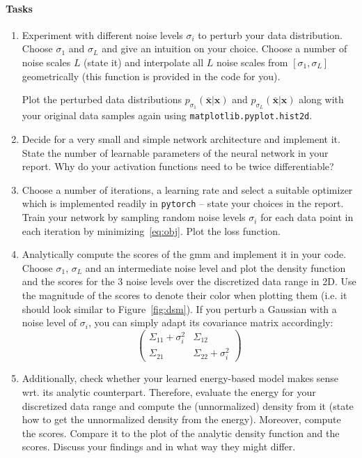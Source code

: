 \documentclass{article}
\renewcommand{\vec}[1]{\textbf{#1}}
\renewcommand{\vec}[1]{\textbf{#1}}
\begin{document}
\paragraph{Tasks}
\begin{enumerate}
\item Experiment with different noise levels $\sigma_i$ to perturb your data distribution. Choose $\sigma_{1}$ and $\sigma_{L}$ and give an intuition on your choice. Choose a number of noise scales $L$ (state it) and interpolate all $L$ noise scales from $[\sigma_1,\sigma_L]$ geometrically (this function is provided in the code for you). 

Plot the perturbed data distributions $p_{\sigma_{1}}(\bar{ \vec x}|\vec x)$ and $p_{\sigma_{L}}(\bar{ \vec x}|\vec x)$ along with your original data samples again using \texttt{matplotlib.pyplot.hist2d}. 
\item Decide for a very small and simple network architecture and implement it. State the number of learnable parameters of the neural network in your report. Why do your activation functions need to be twice differentiable?
\item Choose a number of iterations, a learning rate and select a suitable optimizer which is implemented readily in \texttt{pytorch} -- state your choices in the report. Train your network by sampling random noise levels $\sigma_i$ for each data point in each iteration by minimizing~\eqref{eq:obj}. Plot the loss function. 
\item Analytically compute the scores of the \gls{gmm} and implement it in your code. 
Choose $\sigma_1$, $\sigma_L$ and an intermediate noise level and plot the density function and the scores for the 3 noise levels over the discretized data range in 2D. Use the magnitude of the scores to denote their color when plotting them (i.e. it should look similar to Figure~\ref{fig:dsm}). 
If you perturb a Gaussian with a noise level of $\sigma_i$, you can simply adapt its covariance matrix accordingly:
\[
\begin{pmatrix}
\Sigma_{11} + \sigma_i^2 & \Sigma_{12} \\ \Sigma_{21} & \Sigma_{22} + \sigma_i^2
\end{pmatrix}
\]
\item Additionally, check whether your learned energy-based model makes sense wrt. its analytic counterpart. Therefore, evaluate the energy for your discretized data range and compute the (unnormalized) density from it (state how to get the unnormalized density from the energy). Moreover, compute the scores. Compare it to the plot of the analytic density function and the scores. Discuss your findings and in what way they might differ. 
\end{enumerate}
\end{document}
